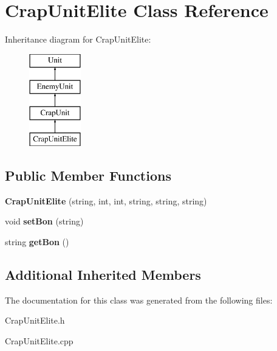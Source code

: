 \hypertarget{class_crap_unit_elite}{}\section{Crap\+Unit\+Elite Class Reference}
\label{class_crap_unit_elite}
Inheritance diagram for Crap\+Unit\+Elite\+:\begin{figure}[H]
\begin{center}
\leavevmode
\includegraphics[height=4.000000cm]{class_crap_unit_elite}
\end{center}
\end{figure}
\subsection*{Public Member Functions}
\begin{DoxyCompactItemize}
\item 
\hypertarget{class_crap_unit_elite_af7be3a6657521fcc0f069885bed1c22e}{}{\bfseries Crap\+Unit\+Elite} (string, int, int, string, string, string)\label{class_crap_unit_elite_af7be3a6657521fcc0f069885bed1c22e}

\item 
\hypertarget{class_crap_unit_elite_a6b51bc5cdaadce0625be6cd97ac0b100}{}void {\bfseries set\+Bon} (string)\label{class_crap_unit_elite_a6b51bc5cdaadce0625be6cd97ac0b100}

\item 
\hypertarget{class_crap_unit_elite_a9ed4d3390c965cc54a46678465de15da}{}string {\bfseries get\+Bon} ()\label{class_crap_unit_elite_a9ed4d3390c965cc54a46678465de15da}

\end{DoxyCompactItemize}
\subsection*{Additional Inherited Members}


The documentation for this class was generated from the following files\+:\begin{DoxyCompactItemize}
\item 
Crap\+Unit\+Elite.\+h\item 
Crap\+Unit\+Elite.\+cpp\end{DoxyCompactItemize}
